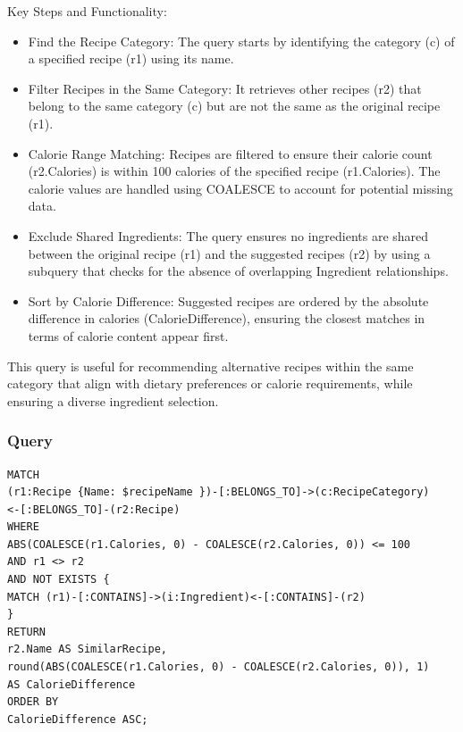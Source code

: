 \begin{enumerate}
Key Steps and Functionality:
    \begin{itemize}
        \item Find the Recipe Category:
The query starts by identifying the category (c) of a specified recipe (r1) using its name.
        \item Filter Recipes in the Same Category:
It retrieves other recipes (r2) that belong to the same category (c) but are not the same as the original recipe (r1).
        \item Calorie Range Matching:
Recipes are filtered to ensure their calorie count (r2.Calories) is within 100 calories of the specified recipe (r1.Calories).
The calorie values are handled using COALESCE to account for potential missing data.
        \item Exclude Shared Ingredients:
The query ensures no ingredients are shared between the original recipe (r1) and the suggested recipes (r2) by using a subquery that checks for the absence of overlapping Ingredient relationships.
        \item Sort by Calorie Difference:
Suggested recipes are ordered by the absolute difference in calories (CalorieDifference), ensuring the closest matches in terms of calorie content appear first.
    \end{itemize}
This query is useful for recommending alternative recipes within the same category that align with dietary preferences or calorie requirements, while ensuring a diverse ingredient selection.
            \subsubsection{Query}
            \begin{verbatim}
MATCH 
(r1:Recipe {Name: $recipeName })-[:BELONGS_TO]->(c:RecipeCategory)
<-[:BELONGS_TO]-(r2:Recipe)
WHERE 
ABS(COALESCE(r1.Calories, 0) - COALESCE(r2.Calories, 0)) <= 100 
AND r1 <> r2 
AND NOT EXISTS {
MATCH (r1)-[:CONTAINS]->(i:Ingredient)<-[:CONTAINS]-(r2)
}
RETURN 
r2.Name AS SimilarRecipe,
round(ABS(COALESCE(r1.Calories, 0) - COALESCE(r2.Calories, 0)), 1) 
AS CalorieDifference
ORDER BY 
CalorieDifference ASC;
            \end{verbatim}

\end{enumerate}
